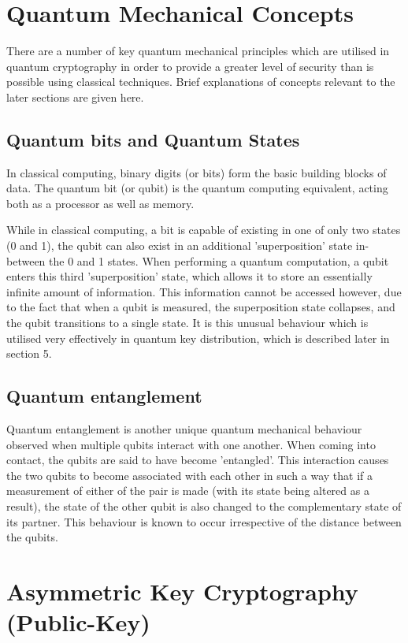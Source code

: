 \documentclass[runningheads,a4paper]{llncs}
\begin{document}
\section{Quantum Mechanical Concepts}

There are a number of key quantum mechanical principles which are utilised in quantum cryptography in order to provide a greater level of security than is possible using classical techniques. Brief explanations of concepts relevant to the later sections are given here.

\subsection{Quantum bits and Quantum States}

In classical computing, binary digits (or bits) form the basic building blocks of data. The quantum bit (or qubit) is the quantum computing equivalent, acting both as a processor as well as memory. 

While in classical computing, a bit is capable of existing in one of only two states (0 and 1), the qubit can also exist in an additional 'superposition' state in-between the 0 and 1 states. When performing a quantum computation, a qubit enters this third 'superposition' state, which allows it to store an essentially infinite amount of information. This information cannot be accessed however, due to the fact that when a qubit is measured, the superposition state collapses, and the qubit transitions to a single state. It is this unusual behaviour which is utilised very effectively in quantum key distribution, which is described later in section 5.

\subsection{Quantum entanglement}

Quantum entanglement is another unique quantum mechanical behaviour observed when multiple qubits interact with one another. When coming into contact, the qubits are said to have become 'entangled'. This interaction causes the two qubits to become associated with each other in such a way that if a measurement of either of the pair is made (with its state being altered as a result), the state of the other qubit is also changed to the complementary state of its partner. This behaviour is known to occur irrespective of the distance between the qubits\cite{Tegmark:2001qh}.

\section{Asymmetric Key Cryptography (Public-Key)} 
\end{document}
